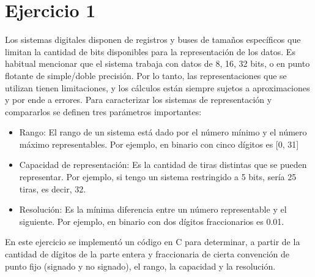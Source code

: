 \newpage
\section*{Ejercicio 1}
Los sistemas digitales disponen de registros y buses de tamaños específicos que limitan la cantidad de bits disponibles para la representación de los datos. Es habitual mencionar que el sistema trabaja con datos de 8, 16, 32 bits, o en punto flotante de simple/doble precisión. Por lo tanto, las representaciones que se utilizan tienen limitaciones, y los cálculos están siempre sujetos a aproximaciones y por ende a errores. Para caracterizar los sistemas de representación y compararlos se definen tres parámetros importantes:    
\begin{itemize}
	\item Rango: El rango de un sistema está dado por el número mínimo y el número máximo representables. Por ejemplo, en binario con cinco dígitos es [0, 31]
	\item Capacidad de representación: Es la cantidad de tiras distintas que se pueden representar. Por ejemplo, si tengo un sistema restringido a 5 bits, sería 25 tiras, es decir, 32. 
	\item Resolución: Es la mínima diferencia entre un número representable y el siguiente. Por ejemplo, en binario con dos dígitos fraccionarios es 0.01.  
\end{itemize}
En este ejercicio se implementó un código en C para determinar, a partir de la cantidad de dígitos de la parte entera y fraccionaria de cierta convención de punto fijo (signado y no signado), el rango, la capacidad y la resolución.

